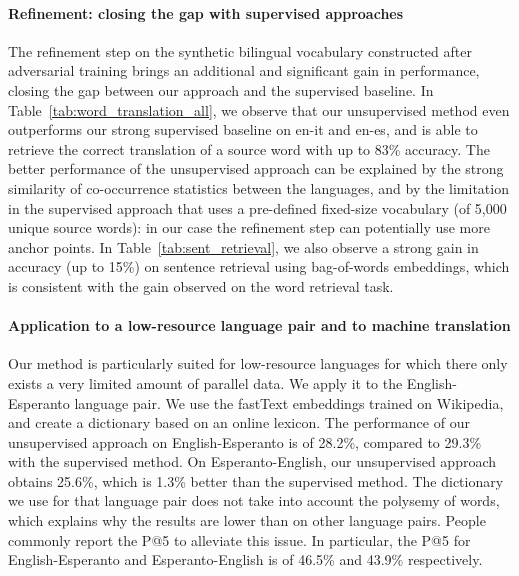 \documentclass{article} \usepackage{iclr2018_conference,times}
\begin{document}
\insertsenttranslation


\paragraph{Refinement: closing the gap with supervised approaches} The refinement step on the synthetic bilingual vocabulary constructed after adversarial training brings an additional and significant gain in performance, closing the gap between our approach and the supervised baseline. In Table~\ref{tab:word_translation_all}, we observe that our unsupervised method even outperforms our strong supervised baseline on en-it and en-es, and is able to retrieve the correct translation of a source word with up to 83\% accuracy. The better performance of the unsupervised approach can be explained by the strong similarity of co-occurrence statistics between the languages, and by the limitation in the supervised approach that uses a pre-defined fixed-size vocabulary (of 5,000 unique source words): in our case the refinement step can potentially use more anchor points. In Table~\ref{tab:sent_retrieval}, we also observe a strong gain in accuracy (up to 15\%) on sentence retrieval using bag-of-words embeddings, which is consistent with the gain observed on the word retrieval task.

\paragraph{Application to a low-resource language pair and to machine translation} Our method is particularly suited for low-resource languages for which there only exists a very limited amount of parallel data. We apply it to the English-Esperanto language pair. We use the fastText embeddings trained on Wikipedia, and create a dictionary based on an online lexicon. The performance of our unsupervised approach on English-Esperanto is of 28.2\%, compared to 29.3\% with the supervised method. On Esperanto-English, our unsupervised approach obtains 25.6\%, which is 1.3\% better than the supervised method.
The dictionary we use for that language pair does not take into account the polysemy of words, which explains why the results are lower than on other language pairs. People commonly report the P@5 to alleviate this issue. In particular, the P@5 for English-Esperanto and Esperanto-English is of 46.5\% and 43.9\% respectively.
\end{document}
